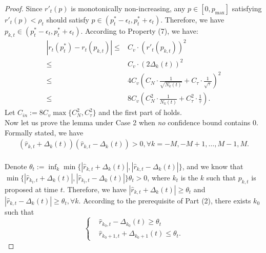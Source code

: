 \begin{proof}
    Since $r'_t(p)$ is monotonically non-increasing, any $p\in[0, p_{\max}]$ satisfying $r'_t(p)<\rho_t$ should satisfy $p\in(p_t^*-\epsilon_t, p_t^*+\epsilon_t)$. Therefore, we have $p_{k,t}\in(p_t^*-\epsilon_t, p_t^*+\epsilon_t)$. According to  Property (7), we have:
    \begin{equation}
        \label{eq:per_round_regret_bound_case_1}
        \begin{aligned}
            |r_t(p_t^*) - r_t(p_{k,t})|\leq&C_v\cdot(r'_t(p_{k,t}))^2\\
            \leq&C_v\cdot(2\Delta_k(t))^2\\
            \leq&4C_v(C_N\cdot\frac1{\sqrt{N_k(t)}} + C_{\tau}\cdot\frac1{\sqrt{\tau}})^2\\
            \leq&8C_v(C_N^2\cdot\frac1{N_k(t)} + C_{\tau}^2\cdot\frac1{\tau}).
        \end{aligned}
    \end{equation}
    Let $C_{in}:=8C_v\max\{C_N^2, C_{\tau}^2\}$ and the first part of  holds.
    \\
    Now let us prove the lemma under Case 2 when \emph{no} confidence bound contains 0. Formally stated, we have
    \begin{equation}
        \label{eq:c20_to_performance_case_2_formally}
        \begin{aligned}
            (\hat r_{k,t} + \Delta_k(t))(\hat r_{k,t} - \Delta_k(t))>0, \forall k=-M, -M+1, \ldots, M-1, M.
        \end{aligned}
    \end{equation}
    \\
    Denote $\theta_t:=\inf_k\min\{|\hat r_{k,t} + \Delta_k(t)|, |\hat r_{k,t} - \Delta_k(t)|\}$, and we know that $\min\{|\hat r_{k_t,t} + \Delta_k(t)|, |\hat r_{k_t,t} - \Delta_k(t)|\}\theta_t>0$, where $k_t$ is the $k$ such that $p_{k, t}$ is proposed at time $t$. Therefore, we have $|\hat r_{k,t} + \Delta_k(t)|\geq\theta_t$ and $|\hat r_{k,t} - \Delta_k(t)|\geq\theta_t, \forall k$. According to the prerequisite of  Part (2), there exists $k_0$ such that
    \begin{equation}
        \label{eq:k_0_+_-}
        \left\{
        \begin{aligned}
           &\hat r_{k_0,t} - \Delta_{k_0}(t) \geq \theta_t\\
           &\hat r_{k_0+1, t} + \Delta_{k_0+1}(t) \leq \theta_t.
        \end{aligned}

\end{equation}
\end{proof}

